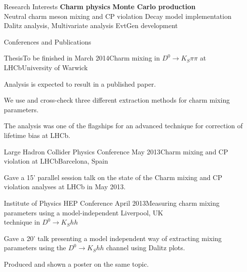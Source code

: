 \documentclass{format/resume} %
\begin{document}

\begin{rSection}{Research Interests}
{\bf Charm physics} \hfill {\bf Monte Carlo production} \\
Neutral charm meson mixing and CP violation \hfill Decay model implementation \\
Dalitz analysis, Multivariate analysis \hfill EvtGen development
\end{rSection}


\begin{rSection}{Conferences and Publications}

\begin{rSubsection}{Thesis}{To be finished in March 2014}{Charm mixing in $D^{0}\rightarrow K_{S}\pi\pi$ at LHCb}{University of Warwick}
\item Analysis is expected to result in a published paper.
\item We use and cross-check three different extraction methods for charm mixing parameters.
\item The analysis was one of the flagships for an advanced technique
  for correction of lifetime bias at LHCb.
\end{rSubsection}


\begin{rSubsection}{Large Hadron Collider Physics Conference}{ May 2013}{Charm mixing and CP violation at LHCb}{Barcelona, Spain}
\item Gave a 15' parallel session talk on the state of the Charm mixing and CP violation analyses at LHCb in May 2013.
\end{rSubsection}


\begin{rSubsection}{Institute of Physics HEP Conference}{ April 2013}{Measuring charm mixing parameters using a model-independent \hfill Liverpool, UK \\ technique in $D^{0} \rightarrow K_{S}hh$}{}
\item Gave a 20' talk presenting a model independent way of extracting mixing parameters using the $D^{0}\rightarrow K_{S}hh$ channel using Dalitz plots.
\item Produced and shown a poster on the same topic.
\end{rSubsection}

\end{rSection}

\end{document}
